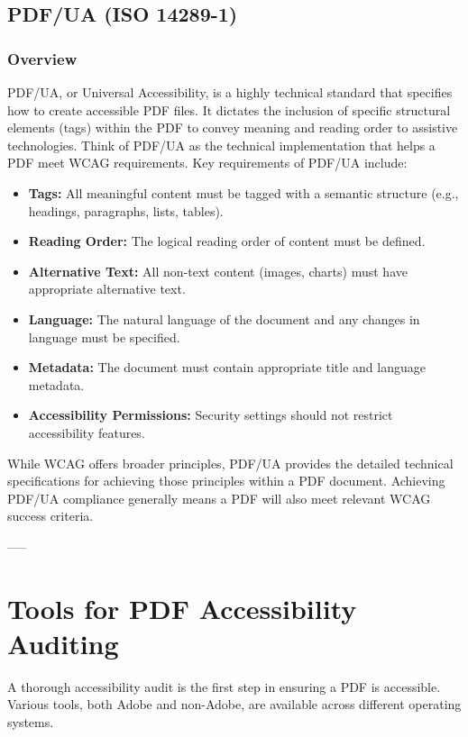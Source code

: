 \subsection{PDF/UA (ISO 14289-1)}
\label{subsec:pdfua}

\subsubsection{Overview}

PDF/UA, or Universal Accessibility, is a highly technical standard that specifies how to create accessible PDF files. It dictates the inclusion of specific structural elements (tags) within the PDF to convey meaning and reading order to assistive technologies. Think of PDF/UA as the technical implementation that helps a PDF meet WCAG requirements. \cite{AdobePDFUA} Key requirements of PDF/UA include:

\begin{itemize}

\item \textbf{Tags:} All meaningful content must be tagged with a semantic structure (e.g., headings, paragraphs, lists, tables).
\item \textbf{Reading Order:} The logical reading order of content must be defined.
\item \textbf{Alternative Text:} All non-text content (images, charts) must have appropriate alternative text.
\item \textbf{Language:} The natural language of the document and any changes in language must be specified.
\item \textbf{Metadata:} The document must contain appropriate title and language metadata.
\item \textbf{Accessibility Permissions:} Security settings should not restrict accessibility features.

\end{itemize}

While WCAG offers broader principles, PDF/UA provides the detailed technical specifications for achieving those principles within a PDF document. Achieving PDF/UA compliance generally means a PDF will also meet relevant WCAG success criteria. \cite{PubComWCAGvsPDFUA}

-----

\section{Tools for PDF Accessibility Auditing}
\label{sec:tools-auditing}
A thorough accessibility audit is the first step in ensuring a PDF is accessible. Various tools, both Adobe and non-Adobe, are available across different operating systems.

